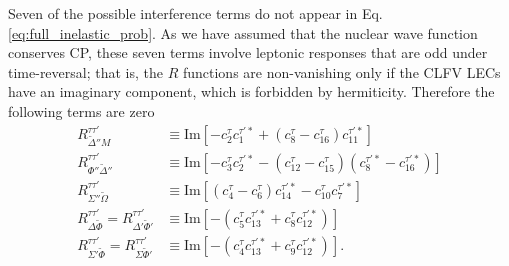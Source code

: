 \documentclass{book}[letterpaper,12pt]
\begin{document}
Seven of the possible interference terms do not appear in Eq. \ref{eq:full_inelastic_prob}. As we have assumed that the nuclear wave function conserves CP, these seven terms involve leptonic responses that are odd under time-reversal; that is, the $R$ functions are non-vanishing only if the CLFV LECs have an imaginary component, which is forbidden by hermiticity. Therefore the following terms are zero
\begin{equation}
\begin{split}
R_{\tilde{\Delta}''M}^{\tau\tau'}&\equiv\mathrm{Im}\left[-c_2^{\tau}c_1^{\tau'*}+(c_8^{\tau}-c_{16}^{\tau})c_{11}^{\tau'*}\right]\\
R_{\Phi''\tilde{\Delta}''}^{\tau\tau'}&\equiv\mathrm{Im}\left[-c_3^{\tau}c_2^{\tau'*}-(c_{12}^{\tau}-c_{15}^{\tau})(c_8^{\tau'*}-c_{16}^{\tau'*})\right]\\
R_{\Sigma''\tilde{\Omega}}^{\tau\tau'}&\equiv\mathrm{Im}\left[(c_4^{\tau}-c_6^{\tau})c_{14}^{\tau'*}-c_{10}^{\tau}c_7^{\tau'*}\right]\\
R_{\Delta\tilde{\Phi}}^{\tau\tau'}=R_{\Delta'\tilde{\Phi}'}^{\tau\tau'}&\equiv\mathrm{Im}\left[-\left(c_5^{\tau}c_{13}^{\tau'*}+c_8^{\tau}c_{12}^{\tau'*}\right)\right]\\
R_{\Sigma'\tilde{\Phi}}^{\tau\tau'}=R_{\Sigma\tilde{\Phi}'}^{\tau\tau'}&\equiv\mathrm{Im}\left[-\left(c_4^{\tau}c_{13}^{\tau'*}+c_9^{\tau}c_{12}^{\tau'*}\right)\right].
\end{split}
\end{equation}
\end{document}
